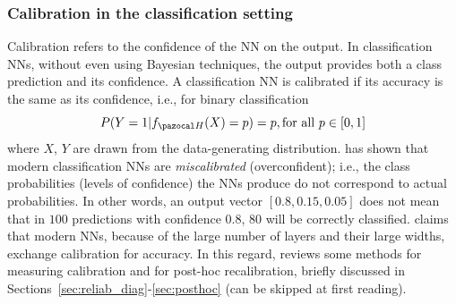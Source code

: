 \subsubsection{Calibration in the classification setting}\label{sec:classcalibration}
Calibration refers to the confidence of the NN on the output.
In classification NNs, without even using Bayesian techniques, the output provides both a class prediction and its confidence. 
A classification NN is calibrated if its accuracy is the same as its confidence, i.e., for binary classification 
\begin{equation}\label{classcalibr}
	P(Y = 1 | f_{\cH}(X) = p) = p, \\ \text{for all }p \in [0,1]
\end{equation}
where $X$, $Y$ are drawn from the data-generating distribution.
\textcite{guo2017calibration} has shown that modern classification NNs are \textit{miscalibrated} (overconfident); i.e., the class probabilities (levels of confidence) the NNs produce do not correspond to actual probabilities. 
In other words, an output vector $[0.8, 0.15, 0.05]$ does not mean that in $100$ predictions with confidence $0.8$, $80$ will be correctly classified. 
\textcite{guo2017calibration} claims that modern NNs, because of the large number of layers and their large widths, exchange calibration for accuracy.
In this regard, \textcite{guo2017calibration} reviews some methods for measuring calibration and for post-hoc recalibration, briefly discussed in Sections~\ref{sec:reliab_diag}-\ref{sec:posthoc} (can be skipped at first reading).

